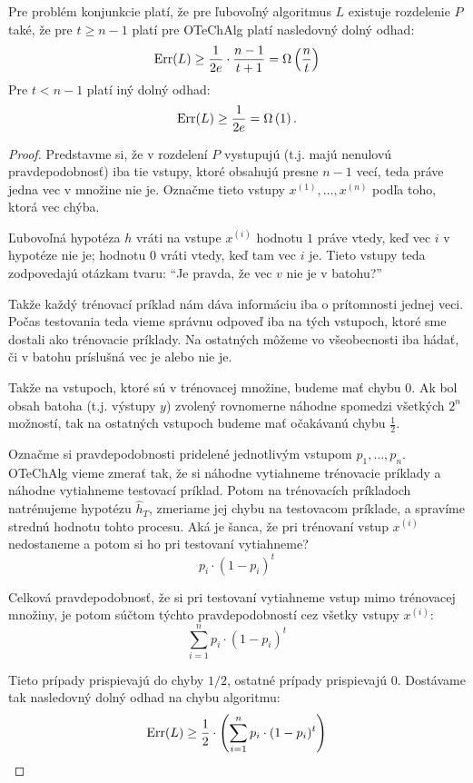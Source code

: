\begin{theorem} \label{thm:mconj_lb}
  Pre problém konjunkcie platí, že pre ľubovoľný algoritmus $L$ existuje
  rozdelenie $P$ také, že pre $t \geq n - 1$ platí pre OTeChAlg platí
  nasledovný dolný odhad:
  $$ \mathrm{Err}(L) \geq \frac{1}{2e} \cdot \frac{n-1}{t+1} = \Omega \left( \frac{n}{t} \right)$$
  Pre $t < n - 1$ platí iný dolný odhad:
  $$ \mathrm{Err}(L) \geq \frac{1}{2e} = \Omega \left( 1 \right). $$
\end{theorem}
\begin{proof}
  Predstavme si, že v rozdelení $P$ vystupujú (t.j. majú nenulovú
  pravdepodobnosť) iba tie vstupy, ktoré obsahujú presne $n - 1$
  vecí, teda práve jedna vec v množine nie je. Označme tieto vstupy
  $x^{(1)}, \ldots, x^{(n)}$ podľa toho, ktorá vec chýba.
  
  Ľubovoľná hypotéza $h$ vráti na vstupe $x^{(i)}$ hodnotu $1$ práve
  vtedy, keď vec $i$ v hypotéze nie je; hodnotu $0$ vráti vtedy, keď tam
  vec $i$ je. Tieto vstupy teda zodpovedajú otázkam tvaru:
  ``Je pravda, že vec $v$ nie je v batohu?''
  
  Takže každý trénovací príklad nám dáva informáciu iba o prítomnosti
  jednej veci. Počas testovania teda vieme správnu odpoveď iba na
  tých vstupoch, ktoré sme dostali ako trénovacie príklady. Na ostatných
  môžeme vo všeobecnosti iba hádať, či v batohu príslušná vec je alebo
  nie je.
  
  Takže na vstupoch, ktoré sú v trénovacej množine, budeme mať chybu $0$.
  Ak bol obsah batoha (t.j. výstupy $y$) zvolený rovnomerne náhodne
  spomedzi všetkých $2^n$ možností, tak na ostatných vstupoch budeme
  mať očakávanú chybu $\frac{1}{2}$.
  
  Označme si pravdepodobnosti pridelené jednotlivým vstupom $p_1, \ldots, p_n$.
  OTeChAlg vieme zmerať tak, že si náhodne vytiahneme trénovacie príklady
  a náhodne vytiahneme testovací príklad. Potom na trénovacích príkladoch
  natrénujeme hypotézu $\hat{h}_T$, zmeriame jej chybu na testovacom príklade,
  a spravíme strednú hodnotu tohto procesu. Aká je šanca, že pri trénovaní
  vstup $x^{(i)}$ nedostaneme a potom si ho pri testovaní vytiahneme?
  $$p_i \cdot (1 - p_i)^t$$
  
  Celková pravdepodobnosť, že si pri testovaní vytiahneme vstup
  mimo trénovacej množiny, je potom súčtom týchto pravdepodobností
  cez všetky vstupy $x^{(i)}$:
  $$\sum_{i=1}^n p_i \cdot (1 - p_i)^t$$
  
  Tieto prípady prispievajú do chyby $1/2$, ostatné prípady prispievajú $0$.
  Dostávame tak nasledovný dolný odhad na chybu algoritmu:
  $$ \mathrm{Err}(L) \geq \frac{1}{2} \cdot \left( \sum_{i=1}^n p_i \cdot (1 - p_i)^t \right) $$
  

\end{proof}
